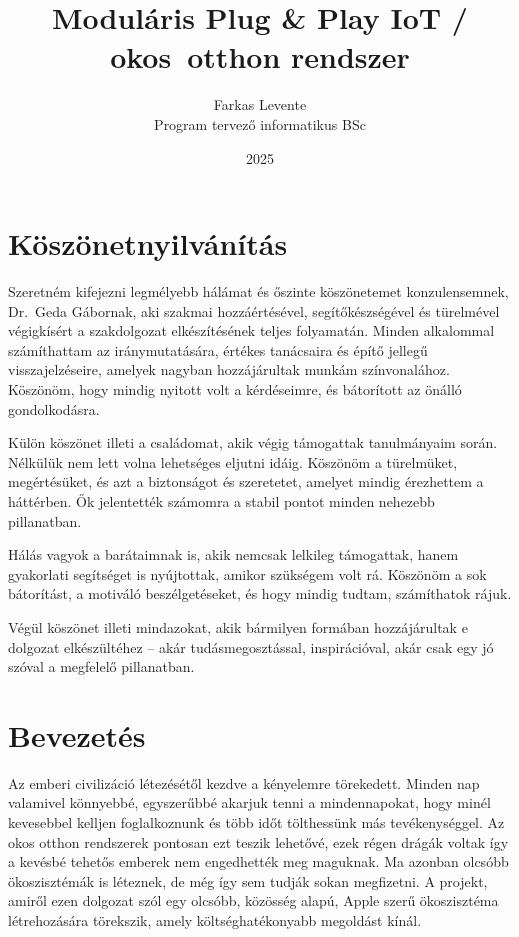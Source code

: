 \documentclass{thesis-ekf}
\theoremstyle{definition}
\theoremstyle{remark}
\begin{document}
	
	\title{Moduláris Plug \& Play IoT / okos~otthon rendszer}
	\author{Farkas Levente\\Program tervező informatikus BSc}
	\date{2025}
	\maketitle
	\chapter*{Köszönetnyilvánítás}
	Szeretném kifejezni legmélyebb hálámat és őszinte köszönetemet konzulensemnek, Dr.~Geda Gábornak, aki szakmai hozzáértésével, segítőkészségével és türelmével végigkísért a szakdolgozat elkészítésének teljes folyamatán. Minden alkalommal számíthattam az iránymutatására, értékes tanácsaira és építő jellegű visszajelzéseire, amelyek nagyban hozzájárultak munkám színvonalához. Köszönöm, hogy mindig nyitott volt a kérdéseimre, és bátorított az önálló gondolkodásra.
	
	Külön köszönet illeti a családomat, akik végig támogattak tanulmányaim során. Nélkülük nem lett volna lehetséges eljutni idáig. Köszönöm a türelmüket, megértésüket, és azt a biztonságot és szeretetet, amelyet mindig érezhettem a háttérben. Ők jelentették számomra a stabil pontot minden nehezebb pillanatban.
	
	Hálás vagyok a barátaimnak is, akik nemcsak lelkileg támogattak, hanem gyakorlati segítséget is nyújtottak, amikor szükségem volt rá. Köszönöm a sok bátorítást, a motiváló beszélgetéseket, és hogy mindig tudtam, számíthatok rájuk.
	
	Végül köszönet illeti mindazokat, akik bármilyen formában hozzájárultak e dolgozat elkészültéhez – akár tudásmegosztással, inspirációval, akár csak egy jó szóval a megfelelő pillanatban.
	
	\tableofcontents
	\chapter*{Bevezetés}
	
	Az emberi civilizáció létezésétől kezdve a kényelemre törekedett. Minden nap valamivel könnyebbé, egyszerűbbé akarjuk tenni a mindennapokat, hogy minél kevesebbel kelljen foglalkoznunk és több időt tölthessünk más tevékenységgel. Az okos otthon rendszerek pontosan ezt teszik lehetővé, ezek régen drágák voltak így  a kevésbé tehetős emberek nem engedhették meg maguknak. Ma azonban olcsóbb ökoszisztémák is léteznek, de még így sem tudják sokan megfizetni. A projekt, amiről ezen dolgozat szól egy olcsóbb, közösség alapú, Apple szerű ökoszisztéma létrehozására törekszik, amely költséghatékonyabb megoldást kínál.
	
\end{document}
